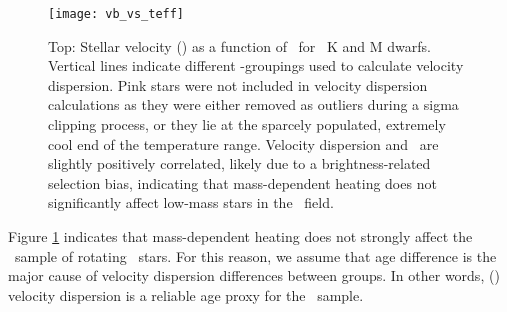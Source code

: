 \begin{figure}
  \caption{
      Top: Stellar velocity (\vb) as a function of \teff\ for
      \kepler\ K and M dwarfs.
Vertical lines indicate different \teff-groupings used to calculate velocity
    dispersion.
Pink stars were not included in velocity dispersion calculations as they were
    either removed as outliers during a sigma clipping process, or they lie at
    the sparcely populated, extremely cool end of the temperature range.
    Velocity dispersion and \teff\ are slightly positively correlated, likely
    due to a brightness-related selection bias, indicating that mass-dependent
    heating does not significantly affect low-mass stars in the \kepler\
    field.
}
  \centering
    \texttt{[image: vb\_vs\_teff]}
\label{fig:vb_vs_teff}
\end{figure}
Figure \ref{fig:vb_vs_teff} indicates that mass-dependent heating does not
strongly affect the \mct\ sample of rotating \kepler\ stars.
For this reason, we assume that age difference is the major cause of velocity
dispersion differences between groups.
In other words, (\vb) velocity dispersion is a reliable age proxy for the
\mct\ sample.
